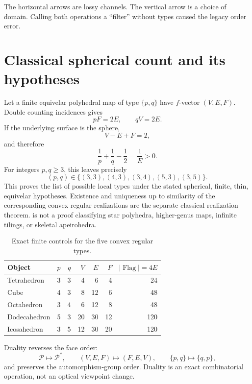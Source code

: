 \documentclass[11pt,a4paper]{article}
\theoremstyle{definition}
\theoremstyle{plain}
\theoremstyle{remark}
\newcommand{\Flag}{\operatorname{Flag}}
\newcommand{\abs}[1]{\left\lvert #1\right\rvert}
\newcommand{\Pcal}{\mathcal P}
\begin{document}
The horizontal arrows are lossy channels.  The vertical arrow is a
choice of domain.  Calling both operations a ``filter'' without types
caused the legacy order error.

\section{Classical spherical count and its hypotheses}

Let a finite equivelar polyhedral map of type \(\{p,q\}\) have
\(f\)-vector \((V,E,F)\).  Double counting incidences gives
\begin{equation}\label{eq:incidence}
pF=2E,\qquad qV=2E.
\end{equation}
If the underlying surface is the sphere,
\begin{equation}\label{eq:euler}
V-E+F=2,
\end{equation}
and therefore
\begin{equation}\label{eq:spherical}
\frac1p+\frac1q-\frac12=\frac1E>0.
\end{equation}
For integers \(p,q\ge3\), this leaves precisely
\[
(p,q)\in\{(3,3),(4,3),(3,4),(5,3),(3,5)\}.
\]
This proves the list of possible local types under the stated
spherical, finite, thin, equivelar hypotheses.  Existence and
uniqueness up to similarity of the corresponding convex regular
realizations are the separate classical realization theorem.
 is not a proof classifying star polyhedra,
higher-genus maps, infinite tilings, or skeletal apeirohedra.

\begin{table}[ht]
\centering
\small
\caption{Exact finite controls for the five convex regular types.}
\begin{tabular}{lrrrrrr}
\toprule
Object & \(p\) & \(q\) & \(V\) & \(E\) & \(F\) & \(\abs{\Flag}=4E\)\\
\midrule
Tetrahedron & 3 & 3 & 4 & 6 & 4 & 24\\
Cube & 4 & 3 & 8 & 12 & 6 & 48\\
Octahedron & 3 & 4 & 6 & 12 & 8 & 48\\
Dodecahedron & 5 & 3 & 20 & 30 & 12 & 120\\
Icosahedron & 3 & 5 & 12 & 30 & 20 & 120\\
\bottomrule
\end{tabular}
\end{table}

Duality reverses the face order:
\[
\Pcal\longmapsto\Pcal^\ast,\qquad
(V,E,F)\longmapsto(F,E,V),\qquad
\{p,q\}\longmapsto\{q,p\},
\]
and preserves the automorphism-group order.  Duality is an exact
combinatorial operation, not an optical viewpoint change.
\end{document}
